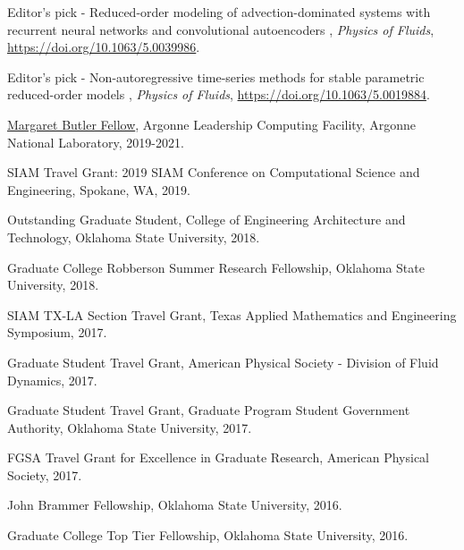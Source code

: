 \documentclass[letterpaper]{article}
\renewenvironment{itemize}{
  \begin{list}{}{
    \setlength{\leftmargin}{1.5em}
  }
}{
  \end{list}
}
\begin{document}
\begin{itemize}
\item Editor's pick - Reduced-order modeling of advection-dominated systems with recurrent neural networks and convolutional autoencoders , {\it Physics of Fluids}, \url{https://doi.org/10.1063/5.0039986}.

\item Editor's pick - Non-autoregressive time-series methods for stable parametric reduced-order models , {\it Physics of Fluids}, \url{https://doi.org/10.1063/5.0019884}.

\item \href{https://www.alcf.anl.gov/margaret-butler-fellowship-computational-science}{Margaret Butler Fellow}, Argonne Leadership Computing Facility, Argonne National Laboratory, 2019-2021.

\item SIAM Travel Grant: 2019 SIAM Conference on Computational Science and Engineering, Spokane, WA, 2019.

\item Outstanding Graduate Student, College of Engineering Architecture and Technology, Oklahoma State University, 2018.

\item Graduate College Robberson Summer Research Fellowship, Oklahoma State University, 2018.

\item SIAM TX-LA Section Travel Grant, Texas Applied Mathematics and Engineering Symposium, 2017.

\item Graduate Student Travel Grant, American Physical Society - Division of Fluid Dynamics, 2017.

\item Graduate Student Travel Grant, Graduate Program Student Government Authority, Oklahoma State University, 2017.

\item FGSA Travel Grant for Excellence in Graduate Research, American Physical Society, 2017.

\item John Brammer Fellowship, Oklahoma State University, 2016.

\item Graduate College Top Tier Fellowship, Oklahoma State University, 2016.

\end{itemize}

\end{document}
